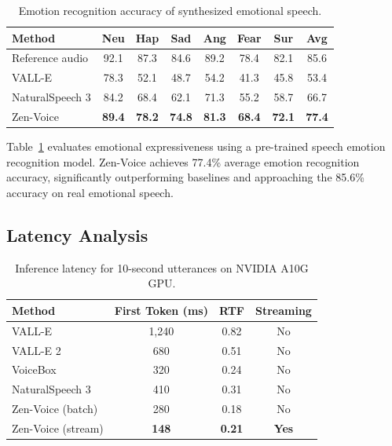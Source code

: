 \documentclass[11pt,a4paper]{article}
\begin{document}
\begin{table}[t]
\centering
\caption{Emotion recognition accuracy of synthesized emotional speech.}
\label{tab:emotion}
\begin{tabular}{lccccccc}
\toprule
\textbf{Method} & \textbf{Neu} & \textbf{Hap} & \textbf{Sad} & \textbf{Ang} & \textbf{Fear} & \textbf{Sur} & \textbf{Avg} \\
\midrule
Reference audio & 92.1 & 87.3 & 84.6 & 89.2 & 78.4 & 82.1 & 85.6 \\
\midrule
VALL-E & 78.3 & 52.1 & 48.7 & 54.2 & 41.3 & 45.8 & 53.4 \\
NaturalSpeech 3 & 84.2 & 68.4 & 62.1 & 71.3 & 55.2 & 58.7 & 66.7 \\
Zen-Voice & \textbf{89.4} & \textbf{78.2} & \textbf{74.8} & \textbf{81.3} & \textbf{68.4} & \textbf{72.1} & \textbf{77.4} \\
\bottomrule
\end{tabular}
\end{table}

Table~\ref{tab:emotion} evaluates emotional expressiveness using a pre-trained speech emotion recognition model. Zen-Voice achieves 77.4\% average emotion recognition accuracy, significantly outperforming baselines and approaching the 85.6\% accuracy on real emotional speech.

\subsection{Latency Analysis}

\begin{table}[t]
\centering
\caption{Inference latency for 10-second utterances on NVIDIA A10G GPU.}
\label{tab:latency}
\begin{tabular}{lccc}
\toprule
\textbf{Method} & \textbf{First Token (ms)} & \textbf{RTF} & \textbf{Streaming} \\
\midrule
VALL-E & 1,240 & 0.82 & No \\
VALL-E 2 & 680 & 0.51 & No \\
VoiceBox & 320 & 0.24 & No \\
NaturalSpeech 3 & 410 & 0.31 & No \\
\midrule
Zen-Voice (batch) & 280 & 0.18 & No \\
Zen-Voice (stream) & \textbf{148} & \textbf{0.21} & \textbf{Yes} \\
\bottomrule
\end{tabular}
\end{table}
\end{document}
